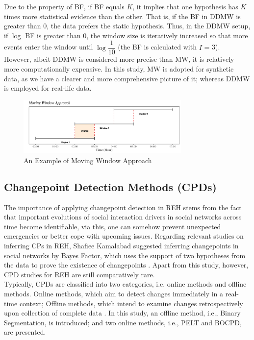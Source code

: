 \documentclass[]{interact}
\theoremstyle{plain}%
\theoremstyle{definition}
\theoremstyle{remark}
\begin{document}
Due to the property of BF, if BF equals $K$, it implies that one hypothesis has $K$ times more statistical evidence than the other. That is, if the BF in DDMW is greater than 0, the data prefers the static hypothesis. Thus, in the DDMW setup, if $\log$ BF is greater than 0, the window size is iteratively increased so that more events enter the window until $\log\dfrac{1}{10}$ (the BF is calculated with $I$ = 3). \\

However, albeit DDMW is considered more precise than MW, it is relatively more computationally expensive. In this study, MW is adopted for synthetic data, as we have a clearer and more comprehensive picture of it; whereas DDMW is employed for real-life data. \\

\begin{figure}[h]
	\includegraphics[width=8.5cm]{MW}
	\centering
	\caption{An Example of Moving Window Approach}
	\label{Figure 1}
\end{figure}

\subsection{Changepoint Detection Methods (CPDs)}

\hspace{0.2cm} The importance of applying changepoint detection in REH stems from the fact that important evolutions of social interaction drivers in social networks across time become identifiable, via this, one can somehow prevent unexpected emergencies or better cope with upcoming issues. Regarding relevant studies on inferring CPs in REH, Shafiee Kamalabad suggested inferring changepoints in social networks by Bayes Factor, which uses the support of two hypotheses from the data to prove the existence of changepoints \cite{kamalabadWhatPointChange}. Apart from this study, however, CPD studies for REH are still comparatively rare. \\

Typically, CPDs are classified into two categories, i.e. online methods and offline methods. Online methods, which aim to detect changes immediately in a real-time context; Offline methods, which intend to examine changes retrospectively upon collection of complete data \cite{truongSelectiveReviewOffline2020}. In this study, an offline method, i.e., Binary Segmentation, is introduced; and two online methods, i.e., PELT and BOCPD, are presented. \\
\end{document}
